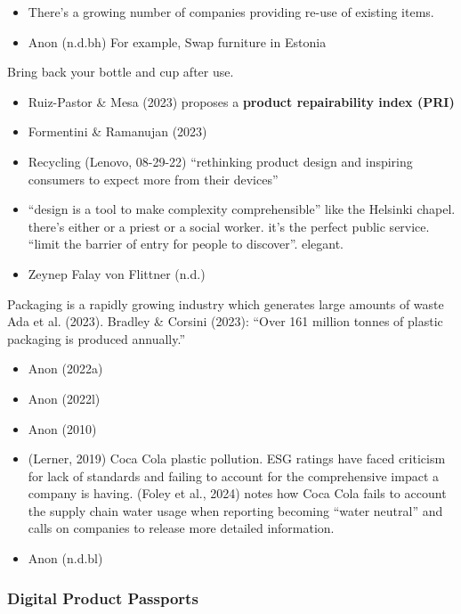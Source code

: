 \documentclass[
  letterpaper,
  DIV=11,
  numbers=noendperiod]{scrartcl}
\providecommand{\tightlist}{%
  \setlength{\itemsep}{0pt}\setlength{\parskip}{0pt}}\usepackage{longtable,booktabs,array}
\begin{document}
\begin{itemize}
\tightlist
\item
  There's a growing number of companies providing re-use of existing
  items.
\item
  Anon (n.d.bh) For example, Swap furniture in Estonia
\end{itemize}

Bring back your bottle and cup after use.

\begin{itemize}
\tightlist
\item
  Ruiz-Pastor \& Mesa (2023) proposes a \textbf{product repairability
  index (PRI)}
\item
  Formentini \& Ramanujan (2023)
\item
  Recycling (Lenovo, 08-29-22) ``rethinking product design and inspiring
  consumers to expect more from their devices''
\item
  ``design is a tool to make complexity comprehensible'' like the
  Helsinki chapel. there's either or a priest or a social worker. it's
  the perfect public service. ``limit the barrier of entry for people to
  discover''. elegant.
\item
  Zeynep Falay von Flittner (n.d.)
\end{itemize}

Packaging is a rapidly growing industry which generates large amounts of
waste Ada et al. (2023). Bradley \& Corsini (2023): ``Over 161 million
tonnes of plastic packaging is produced annually.''

\begin{itemize}
\tightlist
\item
  Anon (2022a)
\item
  Anon (2022l)
\item
  Anon (2010)
\item
  (Lerner, 2019) Coca Cola plastic pollution. ESG ratings have faced
  criticism for lack of standards and failing to account for the
  comprehensive impact a company is having. (Foley et al., 2024) notes
  how Coca Cola fails to account the supply chain water usage when
  reporting becoming ``water neutral'' and calls on companies to release
  more detailed information.
\item
  Anon (n.d.bl)
\end{itemize}

\subsubsection{Digital Product
Passports}\label{digital-product-passports}
\end{document}
